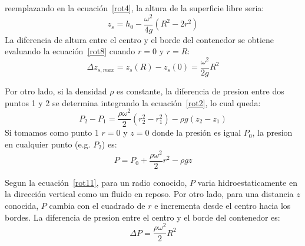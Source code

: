 \documentclass[10pt, oneside]{article}
\begin{document}
reemplazando en la ecuaci\'on~\ref{rot4}, la altura de la superficie libre seria:
\begin{equation}
z_s = h_0 - \frac{\omega^2}{4g} ( R^2 -2r^2 )
\label{rot8}
\end{equation}
La diferencia de altura entre el centro y el borde del contenedor se obtiene evaluando la ecuaci\'on~\ref{rot8} cuando $r=0$ y $r=R$:
\begin{equation}
\Delta z_{s,max} = z_s (R)- z_s (0) = \frac{\omega^2}{2g} R^2
\label{rot9}
\end{equation}

Por otro lado, si la densidad $\rho$ es constante, la diferencia de presion entre dos puntos 1 y 2 se determina integrando la ecuaci\'on~\ref{rot2}, lo cual queda:
\begin{equation}
P_2 - P_1 = \frac{\rho \omega^2}{2}(r_2^2 - r_1^2 ) - \rho g (z_2 - z_1)
\label{rot10}
\end{equation}
Si tomamos como punto 1 $r=0$ y $z=0$ donde la presi\'on es igual $P_0$, la presion en cualquier punto (e.g. $P_2$) es:
\begin{equation}
P = P_0 + \frac{\rho \omega^2}{2} r^2 - \rho g z 
\label{rot11}
\end{equation}

Segun la ecuaci\'on~\ref{rot11}, para un radio conocido, $P$ varia hidroestaticamente en la direcci\'on vertical como un fluido en reposo. Por otro lado, para una distancia $z$ conocida, $P$ cambia con el cuadrado de $r$ e incrementa desde el centro hacia los bordes. La diferencia de presion entre el centro y el borde del contenedor es:
$$
\Delta P = \frac{\rho \omega^2}{2} R^2 
$$
\end{document}

